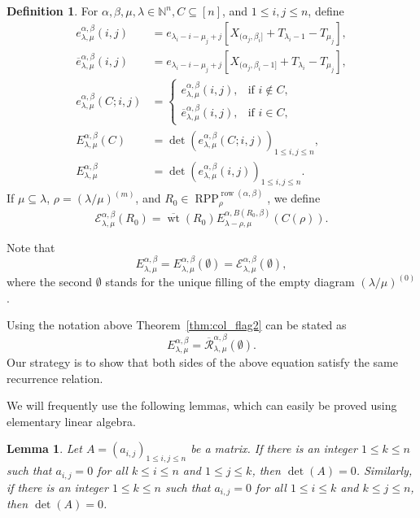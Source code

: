 \documentclass[12pt]{amsart}
\numberwithin{equation}{section}
\newtheorem{lem}[thm]{Lemma}
\theoremstyle{definition}
\newtheorem{defn}[thm]{Definition}
\newcommand\ove{\overline{e}}
\newcommand\row{\operatorname{row}}
\newcommand\NN{\mathbb{N}}
\newcommand\RPP{\operatorname{RPP}}
\newcommand\lm{{\lambda/\mu}}
\newcommand\wt{\operatorname{wt}}
\newcommand\R{\mathcal{R}}
\newcommand\oR{\overline{\R}}
\newcommand\EE{\mathcal{E}}
\newcommand\owt{\overline{\wt}}
\begin{document}
\begin{defn}\label{defn:E}
For $\alpha,\beta,\mu,\lambda\in\NN^n,C\subseteq[n]$, and $1\le i,j\le n$,
define
\begin{align*}
  e_{\lambda,\mu}^{\alpha,\beta}(i,j) &=
  e_{\lambda_i-i-\mu_j+j}[X_{(\alpha_j,\beta_i]}+T_{\lambda_i-1}-T_{\mu_j}],\\
  \ove_{\lambda,\mu}^{\alpha,\beta}(i,j) &=
  e_{\lambda_i-i-\mu_j+j}[X_{(\alpha_j,\beta_i-1]}+T_{\lambda_i}-T_{\mu_j}],\\
  e_{\lambda,\mu}^{\alpha,\beta}(C;i,j) &=
  \begin{cases}
   e_{\lambda,\mu}^{\alpha,\beta}(i,j), & \mbox{if $i\not\in C$},\\
   \ove_{\lambda,\mu}^{\alpha,\beta}(i,j), & \mbox{if $i\in C$},
  \end{cases}\\
  E_{\lambda,\mu}^{\alpha,\beta}(C) &=
  \det(e_{\lambda,\mu}^{\alpha,\beta}(C;i,j))_{1\le i,j\le n},\\
  E_{\lambda,\mu}^{\alpha,\beta} &=
  \det(e_{\lambda,\mu}^{\alpha,\beta}(i,j))_{1\le i,j\le n}.
\end{align*}
If $\mu\subseteq\lambda$, $\rho=(\lm)^{(m)}$, and
$R_0\in\RPP^{\row(\alpha,\beta)}_\rho$, we define
\begin{equation}
  \label{eq:defEE}
  \EE_{\lambda,\mu}^{\alpha,\beta}(R_0) = \owt(R_0) 
  E_{\lambda-\rho,\mu}^{\alpha,B(R_0,\beta)}(C(\rho)).
\end{equation}
\end{defn}
Note that
\[
E_{\lambda,\mu}^{\alpha,\beta}=E_{\lambda,\mu}^{\alpha,\beta}(\emptyset)
=\EE_{\lambda,\mu}^{\alpha,\beta}(\emptyset),
\]
where the second $\emptyset$ stands for the unique filling of 
the empty diagram $(\lm)^{(0)}$.

Using the notation above Theorem~\ref{thm:col_flag2} can be stated as
\[
E_{\lambda,\mu}^{\alpha,\beta} = \oR_{\lambda,\mu}^{\alpha,\beta}(\emptyset).
\]
Our strategy is to show that both sides of the above equation satisfy the same
recurrence relation.


We will frequently use the following lemmas, which can easily be proved using
elementary linear algebra.

\begin{lem}\label{lem:det=0}
  Let $A=(a_{i,j})_{1\le i,j\le n}$ be a matrix. If there is an integer $1\le
  k\le n$ such that $a_{i,j}=0$ for all $k\le i\le n$ and $1\le j\le k$, then
  $\det(A)=0$. Similarly, if there is an integer $1\le k\le n$ such that
  $a_{i,j}=0$ for all $1\le i\le k$ and $k\le j\le n$, then $\det(A)=0$.
\end{lem}
\end{document}
